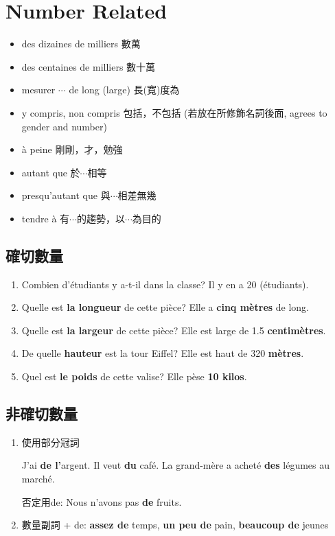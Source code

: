 \documentclass{book}
\begin{document}
    \section{Number Related}
        \begin{itemize}
            \item des dizaines de milliers 數萬
            \item des centaines de milliers 數十萬
            \item mesurer $\cdots$ de long (large) 長(寬)度為
            \item y compris, non compris 包括，不包括 (若放在所修飾名詞後面, agrees to gender and number)
            \item à peine 剛剛，才，勉強
            \item autant que 於$\cdots$相等
            \item presqu'autant que 與$\cdots$相差無幾
            \item tendre à 有$\cdots$的趨勢，以$\cdots$為目的
        \end{itemize}

        \subsection{確切數量}
            \begin{enumerate}
                \item Combien d'étudiants y a-t-il dans la classe? Il y en a 20 (étudiants).
                \item Quelle est \textbf{la longueur} de cette pièce? Elle a \textbf{cinq mètres} de long.
                \item Quelle est \textbf{la largeur} de cette pièce? Elle est large de 1.5 \textbf{centimètres}.
                \item De quelle \textbf{hauteur} est la tour Eiffel? Elle est haut de 320 \textbf{mètres}.
                \item Quel est \textbf{le poids} de cette valise? Elle pèse \textbf{10 kilos}.
            \end{enumerate}
        \subsection{非確切數量}
            \begin{enumerate}
                \item 使用部分冠詞
                    \begin{center}
                        J'ai \textbf{de l'}argent. Il veut \textbf{du} café. La grand-mère a acheté \textbf{des} légumes au marché.
                    \end{center}
                    否定用de: Nous n'avons pas \textbf{de} fruits.
                \item 數量副詞 + de: \textbf{assez de} temps, \textbf{un peu de} pain, \textbf{beaucoup de} jeunes
            \end{enumerate}
\end{document}
